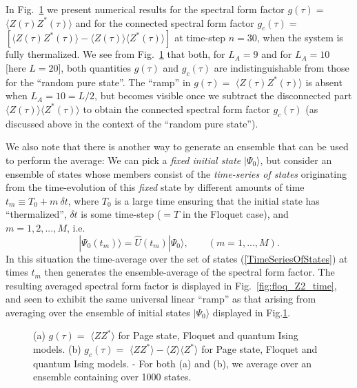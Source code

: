 \documentclass[aps,prb,preprint,onecolumn,amsmath,amssymb,superscriptaddress,eqsecnum,floatfix,scrartcl]{revtex4-1}
\begin{document}
In   Fig.~\ref{fig:Floq_Ising} we
present numerical  results for the spectral form factor $g(\tau)=$  $\langle Z(\tau)Z^*(\tau)\rangle$ and for
the connected spectral form factor $g_c(\tau)=$  $[\langle Z(\tau)Z^*(\tau)\rangle-\langle Z(\tau)\rangle\langle Z^*(\tau)\rangle]$ 
at  time-step $n=30$, when the system
is fully thermalized.
We see from
 Fig.~\ref{fig:Floq_Ising}
that both, 
for  $L_A=9$ and for $L_A=10$ [here $L=20$], both quantities
$g(\tau)$  and  
$g_c(\tau)$
are 
indistinguishable from those for the ``random pure state''.
 The ``ramp''  in
$g(\tau)=$ $\langle Z(\tau)Z^*(\tau)\rangle$ 
is absent  when  $L_A=10=L/2$, but
becomes visible once we subtract the disconnected part
 $\langle Z(\tau)\rangle\langle Z^*(\tau)\rangle$ to obtain the connected spectral form factor
$g_c(\tau)$  (as discussed above
in the context of the ``random pure state'').



We  also note that there is another way to generate an ensemble that can be used to perform the  average: We can pick a {\it fixed
initial state} $|\Psi_0\rangle$, but consider an ensemble of states whose members 
consist of  the {\it time-series of
states} originating from the time-evolution of this {\it fixed} state by different amounts of time
$t_m \equiv T_0 + m  \ \delta t$,  where $T_0$ is a large time ensuring that the initial
state has ``thermalized'', $\delta t$ is some time-step ($=T$ in the Floquet case),
and $m=1, 2, ..., M$, i.e.
\begin{equation}
\label{TimeSeriesOfStates}
|\Psi_0(t_m)\rangle = {\hat U}(t_m) |\Psi_0\rangle, \qquad (m=1, ..., M).
\end{equation}
In this situation the time-average over the set of states
(\ref{TimeSeriesOfStates}) at  times $t_m$ then generates the ensemble-average
of the spectral form factor. The resulting averaged spectral form factor is displayed in Fig.~\ref{fig:floq_Z2_time},
and seen to exhibit the same universal linear ``ramp'' as that arising  from averaging over  the ensemble of initial states $|\Psi_0\rangle$
displayed in Fig.\ref{fig:Floq_Ising}.







\begin{figure}[hbt]
\centering
\caption{
(a) $g(\tau)=$ $\langle ZZ^*\rangle$ for  Page state, Floquet and quantum Ising models. 
 (b) $g_c(\tau)=$ $\langle ZZ^*\rangle-\langle Z\rangle\langle Z^*\rangle$ for Page state, Floquet and quantum  Ising models.  - For both (a) and (b), we average over an ensemble containing over 1000 states.
} 
\label{fig:Floq_Ising}
\end{figure}
\end{document}
